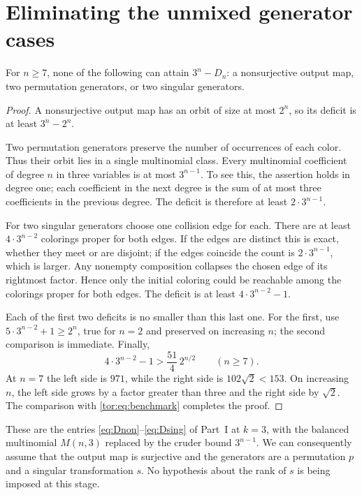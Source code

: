 \documentclass[11pt,a4paper]{article}
\numberwithin{equation}{section}
\theoremstyle{definition}
\theoremstyle{remark}
\begin{document}
\section{Eliminating the unmixed generator cases}\label{tor:sec:unmixed}

\begin{lemma}\label{tor:lem:unmixed}
For $n\ge7$, none of the following can attain $3^n-D_n$: a nonsurjective
output map, two permutation generators, or two singular generators.
\end{lemma}
\begin{proof}
A nonsurjective output map has an orbit of size at most $2^n$, so its
deficit is at least $3^n-2^n$.

Two permutation generators preserve the number of occurrences of each color.
Thus their orbit lies in a single multinomial class. Every multinomial
coefficient of degree $n$ in three variables is at most $3^{n-1}$. To see
this, the assertion holds in degree one; each coefficient in the next degree
is the sum of at most three coefficients in the previous degree. The deficit
is therefore at least $2\cdot3^{n-1}$.

For two singular generators choose one collision edge for each. There are at
least $4\cdot3^{n-2}$ colorings proper for both edges. If the edges are
distinct this is exact, whether they meet or are disjoint; if the edges
coincide the count is $2\cdot3^{n-1}$, which is larger. Any nonempty
composition collapses the chosen edge of its rightmost factor. Hence only the
initial coloring could be reachable among the colorings proper for both
edges. The deficit is at least $4\cdot3^{n-2}-1$.

Each of the first two deficits is no smaller than this last one. For the
first, use $5\cdot3^{n-2}+1\ge2^n$, true for $n=2$ and preserved on
increasing $n$; the second comparison is immediate. Finally,
\[
 4\cdot3^{n-2}-1>\frac{51}{4}\,2^{n/2}\qquad(n\ge7).
\]
At $n=7$ the left side is $971$, while the right side is $102\sqrt2<153$. On
increasing $n$, the left side grows by a factor greater than three and the
right side by $\sqrt2$. The comparison with \eqref{tor:eq:benchmark}
completes the proof.
\end{proof}

These are the entries \eqref{eq:Dnon}--\eqref{eq:Dsing} of Part~I at $k=3$,
with the balanced multinomial $M(n,3)$ replaced by the cruder bound
$3^{n-1}$. We can consequently assume that the output map is surjective and
the generators are a permutation $p$ and a singular transformation $s$. No
hypothesis about the rank of $s$ is being imposed at this stage.
\end{document}
